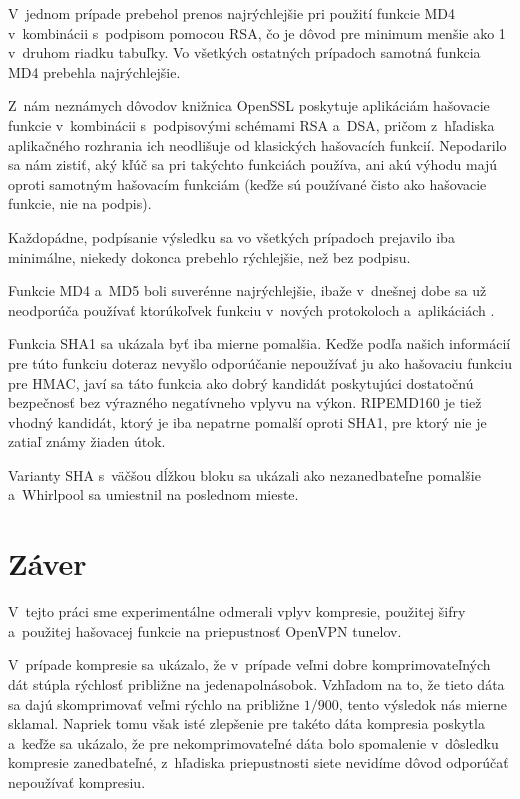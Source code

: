 \documentclass[12pt,a4paper]{article}
\begin{document}
V~jednom prípade prebehol prenos najrýchlejšie pri použití funkcie MD4
v~kombinácii s~podpisom pomocou RSA, čo je dôvod pre minimum menšie ako 1
v~druhom riadku tabuľky. Vo všetkých ostatných prípadoch samotná funkcia
MD4 prebehla najrýchlejšie.

Z~nám neznámych dôvodov knižnica OpenSSL poskytuje aplikáciám hašovacie
funkcie v~kombinácii s~podpisovými schémami RSA a~DSA, pričom z~hľadiska
aplikačného rozhrania ich neodlišuje od klasických hašovacích funkcií.
Nepodarilo sa nám zistiť, aký kľúč sa pri takýchto funkciách používa, ani
akú výhodu majú oproti samotným hašovacím funkciám (keďže sú používané
čisto ako hašovacie funkcie, nie na podpis).

Každopádne, podpísanie výsledku sa vo všetkých prípadoch prejavilo iba
minimálne, niekedy dokonca prebehlo rýchlejšie, než bez podpisu.

Funkcie MD4 a~MD5 boli suverénne najrýchlejšie, ibaže v~dnešnej dobe sa
už neodporúča používať ktorúkoľvek funkciu v~nových protokoloch
a~aplikáciách \cite{rfc-md4-obsolete, rfc-hmac-md5}.

Funkcia SHA1 sa ukázala byť iba mierne pomalšia. Keďže podľa našich
informácií pre túto funkciu doteraz nevyšlo odporúčanie nepoužívať ju ako
hašovaciu funkciu pre HMAC, javí sa táto funkcia ako dobrý kandidát
poskytujúci dostatočnú bezpečnosť bez výrazného negatívneho vplyvu na
výkon. RIPEMD160 je tiež vhodný kandidát, ktorý je iba nepatrne pomalší
oproti SHA1, pre ktorý nie je zatiaľ známy žiaden útok.

Varianty SHA s~väčšou dĺžkou bloku sa ukázali ako nezanedbateľne pomalšie
a~Whirlpool sa umiestnil na poslednom mieste.

\section{Záver}

V~tejto práci sme experimentálne odmerali vplyv kompresie, použitej šifry
a~použitej hašovacej funkcie na priepustnosť OpenVPN tunelov.

V~prípade kompresie sa ukázalo, že v~prípade veľmi dobre komprimovateľných
dát stúpla rýchlosť približne na jedenapolnásobok. Vzhľadom na to, že
tieto dáta sa dajú skomprimovať veľmi rýchlo na približne $1/900$, tento
výsledok nás mierne sklamal. Napriek tomu však isté zlepšenie pre takéto
dáta kompresia poskytla a~keďže sa ukázalo, že pre nekomprimovateľné dáta
bolo spomalenie v~dôsledku kompresie zanedbateľné, z~hľadiska
priepustnosti siete nevidíme dôvod odporúčať nepoužívať kompresiu.
\end{document}
